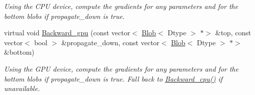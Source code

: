 \begin{DoxyCompactItemize}
\begin{DoxyCompactList}\small\item\em Using the C\+PU device, compute the gradients for any parameters and for the bottom blobs if propagate\+\_\+down is true. \end{DoxyCompactList}\item 
\mbox{\label{classcaffe_1_1_reduction_layer_aca954f31af8b853bce619eef3f3027e8}} 
virtual void \mbox{\hyperlink{classcaffe_1_1_reduction_layer_aca954f31af8b853bce619eef3f3027e8}{Backward\+\_\+gpu}} (const vector$<$ \mbox{\hyperlink{classcaffe_1_1_blob}{Blob}}$<$ Dtype $>$ $\ast$$>$ \&top, const vector$<$ bool $>$ \&propagate\+\_\+down, const vector$<$ \mbox{\hyperlink{classcaffe_1_1_blob}{Blob}}$<$ Dtype $>$ $\ast$$>$ \&bottom)
\begin{DoxyCompactList}\small\item\em Using the G\+PU device, compute the gradients for any parameters and for the bottom blobs if propagate\+\_\+down is true. Fall back to \mbox{\hyperlink{classcaffe_1_1_reduction_layer_aeff33bdb244f2e93eef7ba78b795db45}{Backward\+\_\+cpu()}} if unavailable. \end{DoxyCompactList}\end{DoxyCompactItemize}
